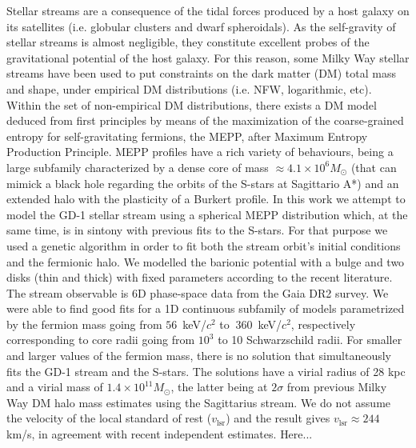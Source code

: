 \documentclass[twocolumn]{aa}
\begin{document}
  \abstract
   {Stellar streams are a consequence of the tidal forces produced by a host galaxy on its satellites (i.e. globular clusters and dwarf spheroidals).
   As the self-gravity of stellar streams is almost negligible, they constitute excellent probes of the gravitational potential of the host galaxy. For this reason, some Milky Way stellar streams have been used to put constraints on the dark matter (DM) total mass and shape, under empirical DM distributions (i.e. NFW, logarithmic, etc). Within the set of non-empirical DM distributions, there exists a DM model
   deduced from first principles by means of the maximization of the coarse-grained entropy for self-gravitating fermions, the MEPP, after Maximum Entropy Production Principle. MEPP profiles have a rich
   variety of behaviours, being a large subfamily characterized by a dense core of mass
   $\approx4.1\times10^6 M_\odot$ (that can mimick a black hole regarding the orbits of the S-stars at Sagittario A*) and an extended halo with the plasticity of a Burkert profile.}
   {In this work we attempt to model the GD-1 stellar stream using a spherical MEPP distribution which, at the same time, is in sintony with previous fits to the S-stars.}
   {For that purpose we used a genetic algorithm in order to fit both the stream orbit's initial conditions and the fermionic halo. We modelled the barionic potential with a bulge and two disks (thin and thick) with fixed parameters according to the recent literature. The stream observable is 6D phase-space data from the Gaia DR2 survey.}
   {We were able to find good fits for a 1D continuous subfamily of models parametrized by the fermion
   mass going from $56$~keV/$c^2$ to $~360$~keV/$c^2$, respectively corresponding to core radii going from
   $10^3$ to 10 Schwarzschild radii. For smaller and larger values of the fermion mass, there is no solution that simultaneously fits the GD-1 stream and the S-stars. The solutions have a virial radius of 28 kpc and a virial mass of $1.4\times10^{11} M_\odot$, the latter being at $2\sigma$ from previous Milky Way DM halo mass estimates using the Sagittarius stream. We do not assume the velocity of the local standard of rest ($v_\mathrm{lsr}$) and the result gives $v_\mathrm{lsr}\approx244$ km/s, in agreement with recent independent estimates.}
   {Here...}

\end{document}
